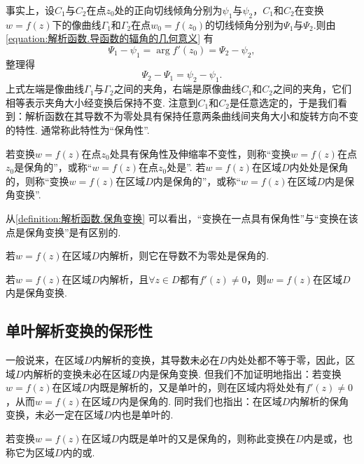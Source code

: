 事实上，设\(C_1\)与\(C_2\)在点\(z_0\)处的正向切线倾角分别为\(\psi_1\)与\(\psi_2\)，\(C_1\)和\(C_2\)在变换\(w = f(z)\)下的像曲线\(\Gamma_1\)和\(\Gamma_2\)在点\(w_0 = f(z_0)\)的切线倾角分别为\(\Psi_1\)与\(\Psi_2\).则由\cref{equation:解析函数.导函数的辐角的几何意义} 有\begin{equation*}
\Psi_1 - \psi_1 = \arg f'(z_0) = \Psi_2 - \psi_2,
\end{equation*}整理得\begin{equation*}
\Psi_2 - \Psi_1 = \psi_2 - \psi_1.
\end{equation*}上式左端是像曲线\(\Gamma_1\)与\(\Gamma_2\)之间的夹角，右端是原像曲线\(C_1\)和\(C_2\)之间的夹角，它们相等表示夹角大小经变换后保持不变.
注意到\(C_1\)和\(C_2\)是任意选定的，于是我们看到：解析函数在其导数不为零处具有保持任意两条曲线间夹角大小和旋转方向不变的特性.
通常称此特性为“保角性”.

\begin{definition}\label{definition:解析函数.保角变换}
若变换\(w = f(z)\)在点\(z_0\)处具有保角性及伸缩率不变性，则称“变换\(w = f(z)\)在点\(z_0\)是保角的”，或称“\(w = f(z)\)在点\(z_0\)处是”.
若\(w = f(z)\)在区域\(D\)内处处是保角的，则称“变换\(w = f(z)\)在区域\(D\)内是保角的”，或称“\(w = f(z)\)在区域\(D\)内是保角变换”.
\end{definition}
从\cref{definition:解析函数.保角变换} 可以看出，“变换在一点具有保角性”与“变换在该点是保角变换”是有区别的.

\begin{theorem}
若\(w = f(z)\)在区域\(D\)内解析，则它在导数不为零处是保角的.
\end{theorem}

\begin{corollary}
若\(w = f(z)\)在区域\(D\)内解析，且\(\forall z \in D\)都有\(f'(z) \neq 0\)，则\(w = f(z)\)在区域\(D\)内是保角变换.
\end{corollary}

\subsection{单叶解析变换的保形性}
一般说来，在区域\(D\)内解析的变换，其导数未必在\(D\)内处处都不等于零，因此，区域\(D\)内解析的变换未必在区域\(D\)内是保角变换.
但我们不加证明地指出：若变换\(w = f(z)\)在区域\(D\)内既是解析的，又是单叶的，则在区域内将处处有\(f'(z)\neq0\)，从而\(w = f(z)\)在区域\(D\)内是保角的.
同时我们也指出：在区域\(D\)内解析的保角变换，未必一定在区域\(D\)内也是单叶的.

\begin{definition}
若变换\(w = f(z)\)在区域\(D\)内既是单叶的又是保角的，则称此变换在\(D\)内是或，也称它为区域\(D\)内的或.
\end{definition}

